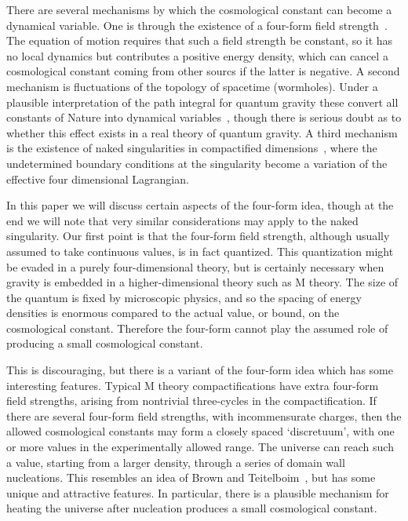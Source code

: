 \documentclass[12pt]{article}
\begin{document}
There are several mechanisms by which the cosmological constant can
become a dynamical variable.  One is through the existence of a
four-form field strength~\cite{AurNic80,DufNie80,Haw84b}.  The
equation of motion requires that such a field strength be constant, so
it has no local dynamics but contributes a positive energy density,
which can cancel a cosmological constant coming from other sourcs if
the latter is negative.  A second mechanism is fluctuations of the
topology of spacetime (wormholes).  Under a plausible interpretation
of the path integral for quantum gravity these convert all constants
of Nature into dynamical variables~\cite{Col88,GidStr88}, though there
is serious doubt as to whether this effect exists in a real theory of
quantum gravity.  A third mechanism is the existence of naked
singularities in compactified dimensions~\cite{Ark00,Kac00}, where the
undetermined boundary conditions at the singularity become a variation
of the effective four dimensional Lagrangian.

In this paper we will discuss certain aspects of the four-form idea,
though at the end we will note that very similar considerations may
apply to the naked singularity.  Our first point is that the four-form
field strength, although usually assumed to take continuous values, is
in fact quantized.  This quantization might be evaded in a purely
four-dimensional theory, but is certainly necessary when gravity is
embedded in a higher-dimensional theory such as M theory.  The size of
the quantum is fixed by microscopic physics, and so the spacing of
energy densities is enormous compared to the actual value, or bound,
on the cosmological constant.  Therefore the four-form cannot play the
assumed role of producing a small cosmological constant.

This is discouraging, but there is a variant of the four-form idea
which has some interesting features.  Typical M theory
compactifications have extra four-form field strengths, arising from
nontrivial three-cycles in the compactification.  If there are several
four-form field strengths, with incommensurate charges, then the
allowed cosmological constants may form a closely spaced `discretuum',
with one or more values in the experimentally allowed range.  The
universe can reach such a value, starting from a larger density,
through a series of domain wall nucleations.  This resembles an idea
of Brown and Teitelboim~\cite{BroTei87,BroTei88}, but has some unique
and attractive features.  In particular, there is a plausible
mechanism for heating the universe after nucleation produces a small
cosmological constant.
\end{document}
